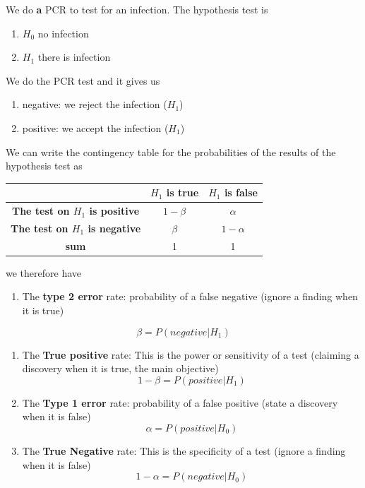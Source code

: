 \documentclass[
]{book}
\providecommand{\tightlist}{%
  \setlength{\itemsep}{0pt}\setlength{\parskip}{0pt}}
\begin{document}
We do \textbf{a} PCR to test for an infection. The hypothesis test is

\begin{enumerate}
\def\labelenumi{\alph{enumi}.}
\tightlist
\item
  \(H_0\) no infection
\item
  \(H_1\) there is infection
\end{enumerate}

We do the PCR test and it gives us

\begin{enumerate}
\def\labelenumi{\roman{enumi}.}
\tightlist
\item
  negative: we reject the infection (\(H_1\))
\item
  positive: we accept the infection (\(H_1\))
\end{enumerate}

We can write the contingency table for the probabilities of the results of the hypothesis test as

\begin{longtable}[]{@{}ccc@{}}
\toprule\noalign{}
& \(H_1\) is true & \(H_1\) is false \\
\midrule\noalign{}
\endhead
\bottomrule\noalign{}
\endlastfoot
\textbf{The test on \(H_1\) is positive} & \(1-\beta\) & \(\alpha\) \\
\textbf{The test on \(H_1\) is negative} & \(\beta\) & \(1-\alpha\) \\
\textbf{sum} & 1 & 1 \\
\end{longtable}

we therefore have

\begin{enumerate}
\def\labelenumi{\arabic{enumi}.}
\tightlist
\item
  The \textbf{type 2 error} rate: probability of a false negative (ignore a finding when it is true)
\end{enumerate}

\[\beta=P(negative|H_1)\]

\begin{enumerate}
\def\labelenumi{\arabic{enumi}.}
\setcounter{enumi}{1}
\item
  The \textbf{True positive} rate: This is the power or sensitivity of a test (claiming a discovery when it is true, the main objective)
  \[1-\beta=P(positive|H_1)\]
\item
  The \textbf{Type 1 error} rate: probability of a false positive (state a discovery when it is false)
  \[\alpha=P(positive|H_0)\]
\item
  The \textbf{True Negative} rate: This is the specificity of a test (ignore a finding when it is false)
  \[1-\alpha=P(negative|H_0)\]
\end{enumerate}
\end{document}

